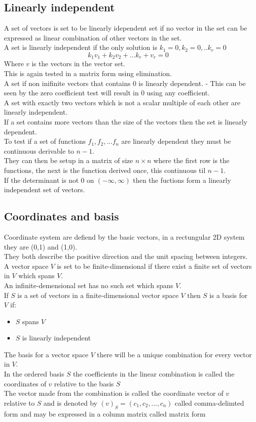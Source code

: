 \documentclass[12pt, a4paper]{article}
\begin{document}
		\subsection{Linearly independent}
			A set of vectors is set to be linearly idependent set if no vector in the set can be expressed as linear combination of other vectors in the set.\\
			A set is linearly independent if the only solution is $k_1=0,k_2=0,..k_r=0$
			$$k_1v_1+k_2v_2+...k_r+v_r=0$$
			Where $v$ is the vectors in the vector set.\\
			This is again tested in a matrix form using elimination.\\
			A set if non inifinite vectors that contains 0 is linearly dependent. - This can be seen by the zero coefficient test will result in 0 using any coefficient.\\
			A set with exactly two vectors which is not a scalar multiple of each other are linearly independent.\\
			If a set contains more vectors than the size of the vectors then the set is linearly dependent.\\[4mm]
			To test if a set of functions $f_1,f_2,...f_n$ are linearly dependent they must be continuous derivable to $n-1$.\\
			They can then be setup in a matrix of size $n\times n$ where the first row is the functions, the next is the function derived once, this continuous til $n-1$.\\
			If the determinant is not 0 on $(-\infty,\infty)$ then the fuctions form a linearly independent set of vectors.
		\subsection{Coordinates and basis}
			Coordinate system are defiend by the basic vectors, in a rectungular 2D system they are (0,1) and (1,0).\\
			They both describe the positive direction and the unit spacing between integers.\\
			A vector space $V$ is set to be finite-dimensional if there exist a finite set of vectors in $V$ which spans $V$.\\
			An infinite-demensional set has no such set which spans $V$.\\
			If $S$ is a set of vectors in a finite-dimensional vector space $V$ then $S$ is a basis for $V$ if:
			\begin{itemize}
				\item $S$ spans $V$
				\item $S$ is linearly independent
			\end{itemize}
			The basis for a vector space $V$ there will be a unique combination for every vector in $V$.\\
			In the ordered basis $S$ the coefficients in the linear combination is called the coordinates of $v$ relative to the basis $S$\\
			The vector made from the combination is called the coordinate vector of $v$ relative to $S$ and is denoted by $(v)_S=(c_1,c_2,...,c_n)$ called comma-delimted form and may be expressed in a column matrix called matrix form\\
\end{document}
